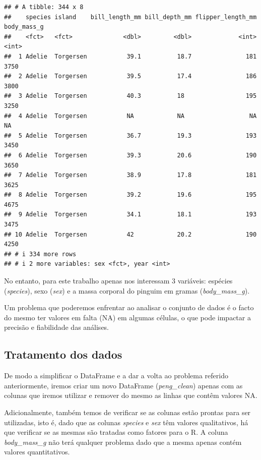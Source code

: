 \documentclass[]{article}
\begin{document}
\begin{verbatim}
## # A tibble: 344 x 8
##    species island    bill_length_mm bill_depth_mm flipper_length_mm body_mass_g
##    <fct>   <fct>              <dbl>         <dbl>             <int>       <int>
##  1 Adelie  Torgersen           39.1          18.7               181        3750
##  2 Adelie  Torgersen           39.5          17.4               186        3800
##  3 Adelie  Torgersen           40.3          18                 195        3250
##  4 Adelie  Torgersen           NA            NA                  NA          NA
##  5 Adelie  Torgersen           36.7          19.3               193        3450
##  6 Adelie  Torgersen           39.3          20.6               190        3650
##  7 Adelie  Torgersen           38.9          17.8               181        3625
##  8 Adelie  Torgersen           39.2          19.6               195        4675
##  9 Adelie  Torgersen           34.1          18.1               193        3475
## 10 Adelie  Torgersen           42            20.2               190        4250
## # i 334 more rows
## # i 2 more variables: sex <fct>, year <int>
\end{verbatim}

No entanto, para este trabalho apenas nos interessam 3 variáveis:
espécies (\emph{species}), sexo (\emph{sex}) e a massa corporal do
pinguim em gramas (\emph{body\_mass\_g}).

Um problema que poderemos enfrentar ao analisar o conjunto de dados é o
facto do mesmo ter valores em falta (NA) em algumas células, o que pode
impactar a precisão e fiabilidade das análises.

\subsection{Tratamento dos dados}

De modo a simplificar o DataFrame e a dar a volta ao problema referido
anteriormente, iremos criar um novo DataFrame (\emph{peng\_clean})
apenas com as colunas que iremos utilizar e remover do mesmo as linhas
que contêm valores NA.

Adicionalmente, também temos de verificar se as colunas estão prontas
para ser utilizadas, isto é, dado que as colunas \emph{species} e
\emph{sex} têm valores qualitativos, há que verificar se as mesmas são
tratadas como fatores para o R. A coluna \emph{body\_mass\_g} não terá
qualquer problema dado que a mesma apenas contém valores quantitativos.
\end{document}
